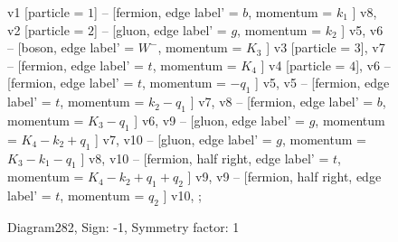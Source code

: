 \documentclass{revtex4}
\begin{document}
\begin{figure}[!htb]
\begin{center}
{    %
v1 [particle = \(1\)] -- [fermion, edge label' = \(b\), momentum = \(k_{1}\) ] v8, 
v2 [particle = \(2\)] -- [gluon, edge label' = \(g\), momentum = \(k_{2}\) ] v5, 
v6 -- [boson, edge label' = \(W^{-}\), momentum = \(K_{3}\) ] v3 [particle = \(3\)], 
v7 -- [fermion, edge label' = \(t\), momentum = \(K_{4}\) ] v4 [particle = \(4\)], 
v6 -- [fermion, edge label' = \(t\), momentum = \(-q_{1}\) ] v5, 
v5 -- [fermion, edge label' = \(t\), momentum = \(k_{2} - q_{1}\) ] v7, 
v8 -- [fermion, edge label' = \(b\), momentum = \(K_{3} - q_{1}\) ] v6, 
v9 -- [gluon, edge label' = \(g\), momentum = \(K_{4} - k_{2} + q_{1}\) ] v7, 
v10 -- [gluon, edge label' = \(g\), momentum = \(K_{3} - k_{1} - q_{1}\) ] v8, 
v10 -- [fermion, half right, edge label' = \(t\), momentum = \(K_{4} - k_{2} + q_{1} + q_{2}\) ] v9, 
v9 -- [fermion, half right, edge label' = \(t\), momentum = \(q_{2}\) ] v10, 
};
\end{center}
\caption{Diagram282, Sign: -1, Symmetry factor: 1}
\end{figure}
\newpage
\end{document}

